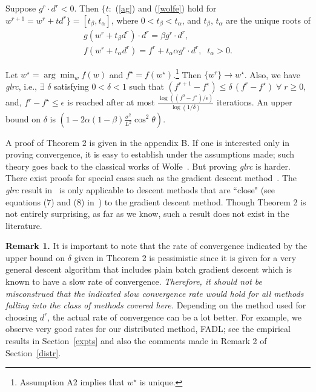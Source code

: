 \documentclass[twoside, 11pt]{article}
\begin{document}
 Suppose $g^r\cdot d^r<0$.
Then $\{ t: $ (\ref{ag}) and (\ref{wolfe}) hold for $w^{r+1}=w^r+td^r\} = [t_\beta,t_\alpha]$, where $0<t_\beta<t_\alpha$, and $t_\beta$, $t_\alpha$ are the unique roots of
\begin{eqnarray}
g(w^r+t_\beta d^r)\cdot d^r = \beta g^r\cdot d^r, \label{tbeta} \\
f(w^r+t_\alpha d^r) = f^r + t_\alpha \alpha g^r\cdot d^r, \;\; t_\alpha>0. \label{talpha}
\end{eqnarray}


 Let $w^\star=\arg\min_w f(w)$ and $f^\star=f(w^\star)$.\footnote{Assumption A2 implies that $w^\star$ is unique.} Then $\{w^r\}\rightarrow w^\star$. Also, we have {\it glrc}, i.e., $\exists$ $\delta$ satisfying $0<\delta<1$ such that
$(f^{r+1} - f^\star) \le \delta\, (f^r-f^\star) \; \forall \; r\ge 0$,
and, $f^r-f^\star\le\epsilon$ is reached after at most
$\frac{\log ((f^0-f^\star)/\epsilon)}{\log(1/\delta)}$
iterations. An upper bound on $\delta$ is $(1 - 2\alpha(1-\beta)\frac{\sigma^2}{L^2} \cos^2\theta)$.

A proof of Theorem 2 is given in the appendix B. If one is interested only in proving convergence, it is easy to establish under the assumptions made; such theory goes back to the classical works of Wolfe~\citep{wolfe1969, wolfe1971}. But proving {\it glrc} is harder. There exist proofs for special cases such as the gradient descent method~\citep{boyd2004}. The {\it glrc} result in~\citet{wang2013} is only applicable to descent methods that are ``close" (see equations ($7$) and ($8$) in~\citet{wang2013}) to the gradient descent method. Though Theorem 2 is not entirely surprising, as far as we know, such a result does not exist in the literature.


{\bf Remark 1.} It is important to note that the rate of convergence indicated by the upper bound on $\delta$ given in Theorem 2 is pessimistic since it is given for a very general descent algorithm that includes plain batch gradient descent which is known to have a slow rate of convergence. {\it Therefore, it should not be misconstrued that the indicated slow convergence rate would hold for all methods falling into the class of methods covered here.} Depending on the method used for choosing $d^r$, the actual rate of convergence can be a lot better. For example, we observe very good rates for our distributed method, FADL; see the empirical results in Section~\ref{expts} and also the comments made in Remark 2 of Section~\ref{distr}.
\end{document}
